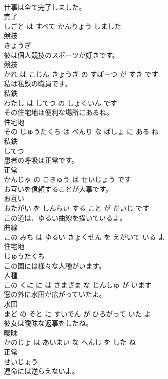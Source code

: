 \documentclass[8pt]{extreport}
\begin{document}
\begin{CJK}{UTF8}{min}
\\	仕事は全て完了しました。	
\\	完了 
\\	しごと は すべて かんりょう しました			
\\	競技	
\\	きょうぎ		
\\	彼は個人競技のスポーツが好きです。	
\\	競技 
\\	かれ は こじん きょうぎ の すぽーつ が すき です			
\\	私は私鉄の職員です。	
\\	私鉄 
\\	わたし は してつ の しょくいん です			
\\	その住宅地は便利な場所にあるね。	
\\	住宅地 
\\	その じゅうたくち は べんり な ばしょ に ある ね			
\\	私鉄	
\\	してつ		
\\	患者の呼吸は正常です。	
\\	正常 
\\	かんじゃ の こきゅう は せいじょう です			
\\	お互いを信頼することが大事です。	
\\	お互い 
\\	おたがい を しんらい する こと が だいじ です			
\\	この道は、ゆるい曲線を描いているよ。	
\\	曲線 
\\	この みち は ゆるい きょくせん を えがいて いる よ			
\\	住宅地	
\\	じゅうたくち		
\\	この国には様々な人種がいます。	
\\	人種 
\\	この くに に は さまざま な じんしゅ が います			
\\	窓の外に水田が広がっていたよ。	
\\	水田 
\\	まど の そと に すいでん が ひろがって いた よ			
\\	彼女は曖昧な返事をしたね。	
\\	曖昧 
\\	かのじょ は あいまい な へんじ を した ね			
\\	正常	
\\	せいじょう		
\\	運命には逆らえないよ。	

\end{CJK}
\end{document}
